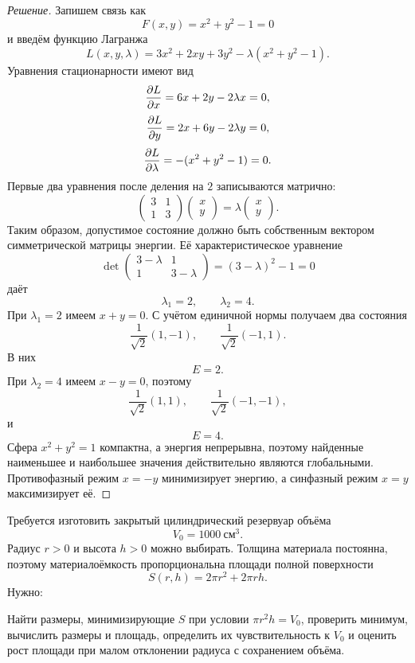 \begin{proof}[Решение]
Запишем связь как
\[
F(x,y)=x^2+y^2-1=0
\]
и введём функцию Лагранжа
\[
L(x,y,\lambda)
=
3x^2+2xy+3y^2-\lambda(x^2+y^2-1).
\]
Уравнения стационарности имеют вид
\[
\frac{\partial L}{\partial x}=6x+2y-2\lambda x=0,
\]
\[
\frac{\partial L}{\partial y}=2x+6y-2\lambda y=0,
\]
\[
\frac{\partial L}{\partial \lambda}=-(x^2+y^2-1)=0.
\]
Первые два уравнения после деления на \(2\) записываются матрично:
\[
\begin{pmatrix}
3&1\\
1&3
\end{pmatrix}
\begin{pmatrix}
x\\y
\end{pmatrix}
=
\lambda
\begin{pmatrix}
x\\y
\end{pmatrix}.
\]
Таким образом, допустимое состояние должно быть собственным вектором симметрической матрицы энергии. Её характеристическое уравнение
\[
\det
\begin{pmatrix}
3-\lambda&1\\
1&3-\lambda
\end{pmatrix}
=(3-\lambda)^2-1=0
\]
даёт
\[
\lambda_1=2,
\qquad
\lambda_2=4.
\]
При \(\lambda_1=2\) имеем \(x+y=0\). С учётом единичной нормы получаем два состояния
\[
\frac{1}{\sqrt2}(1,-1),
\qquad
\frac{1}{\sqrt2}(-1,1).
\]
В них
\[
E=2.
\]
При \(\lambda_2=4\) имеем \(x-y=0\), поэтому
\[
\frac{1}{\sqrt2}(1,1),
\qquad
\frac{1}{\sqrt2}(-1,-1),
\]
и
\[
E=4.
\]
Сфера \(x^2+y^2=1\) компактна, а энергия непрерывна, поэтому найденные наименьшее и наибольшее значения действительно являются глобальными. Противофазный режим \(x=-y\) минимизирует энергию, а синфазный режим \(x=y\) максимизирует её.
\end{proof}

\begin{problem}
Требуется изготовить закрытый цилиндрический резервуар объёма
\[
V_0=1000\ \text{см}^3.
\]
Радиус \(r>0\) и высота \(h>0\) можно выбирать. Толщина материала постоянна, поэтому материалоёмкость пропорциональна площади полной поверхности
\[
S(r,h)=2\pi r^2+2\pi rh.
\]
Нужно:

Найти размеры, минимизирующие \(S\) при условии \(\pi r^2h=V_0\), проверить минимум, вычислить размеры и площадь, определить их чувствительность к \(V_0\) и оценить рост площади при малом отклонении радиуса с сохранением объёма.
\end{problem}

